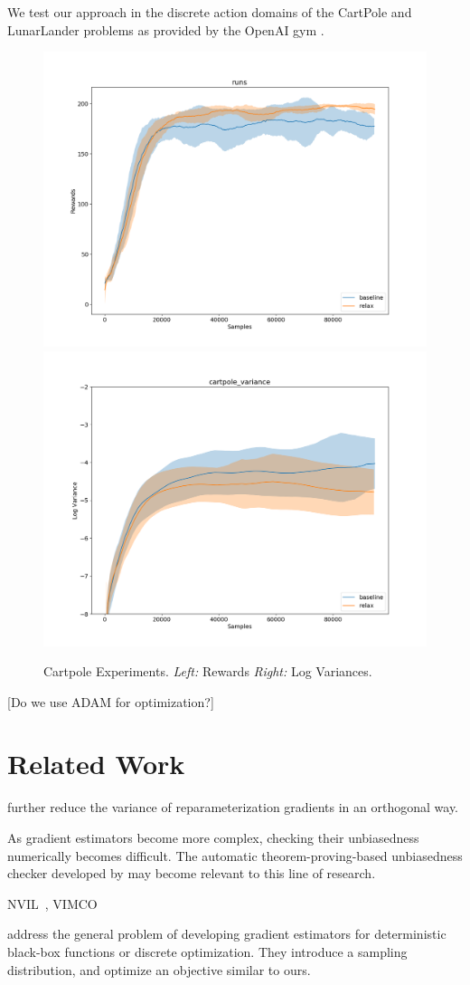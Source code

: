 \documentclass{article}
\begin{document}
We test our approach in the discrete action domains of the CartPole and LunarLander problems as provided by the OpenAI gym \cite{gym}.
\begin{figure}[h]
\begin{center}
\includegraphics[width=.4\textwidth]{figures/cartpole_rewards}
\includegraphics[width=.4\textwidth]{figures/cartpole_var}
\label{first figure}
\end{center}
\caption{Cartpole Experiments.
\emph{Left:} Rewards
\emph{Right:} Log Variances.
}
\end{figure}

\citet{mnih-dqn-2015}

[Do we use ADAM \citep{kingma2015adam} for optimization?]





\section{Related Work}
\label{related work}

\citet{miller2017reducing} further reduce the variance of reparameterization gradients in an orthogonal way.

As gradient estimators become more complex, checking their unbiasedness numerically becomes difficult.
The automatic theorem-proving-based unbiasedness checker developed by \citet{selsam2017developing} may become relevant to this line of research.

NVIL~\citep{mnih2014neural}, VIMCO~\citep{mnih2016variational}

\citet{staines2012variational} address the general problem of developing gradient estimators for deterministic black-box functions or discrete optimization.
They introduce a sampling distribution, and optimize an objective similar to ours. 
\end{document}
